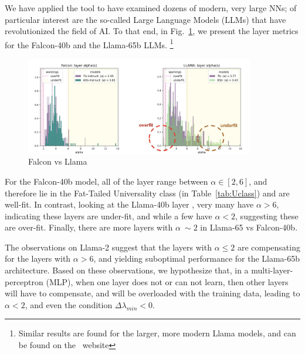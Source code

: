 We have applied the \WW tool to have examined dozens
of modern, very large NNs; of particular interest are the so-called Large Language Models
(LLMs) that have revolutionized the field of AI.  To that end, in Fig.~\ref{fig:falcon_vs_llama},
we present the \WW layer \ALPHA metrics for the Falcon-40b and the Llama-65b LLMs.
\footnote{Similar results are found for the larger, more modern Llama models,
and can be found on the ~\WW website\cite{WW}}

\begin{figure}[ht!]
    \centering
    \includegraphics[width=10cm]{./img/falcon_vs_llama.png}
    \caption{Falcon vs Llama}
   \label{fig:falcon_vs_llama}
\end{figure}

For the Falcon-40b model, all of the layer \ALPHA range between $\alpha\in[2,6]$,
and therefore lie in the Fat-Tailed Universality class (in Table~\ref{tab:Uclass})
and are well-fit.
In contrast, looking at the Llama-40b layer \ALPHA, very many have $\alpha>6$,
indicating these layers are under-fit, and while a few have $\alpha <2$, suggesting
these are over-fit.  Finally, there are more layers with $\alpha~\sim2$ in Llama-65
vs Falcon-40b.

The observations on Llama-2 suggest that the layers with $\alpha\le 2$
are compensating for the layers with $\alpha>6$, and yielding suboptimal
performance for the Llama-65b architecture.
Based on these observations, we hypothesize that, in a multi-layer-perceptron (MLP),
when one layer does not or can not learn, then other layers will
have to compensate, and will be overloaded with the training data,
leading to $\alpha<2$, and even the \TRACELOG condition $\Delta \lambda_{min} < 0$.


